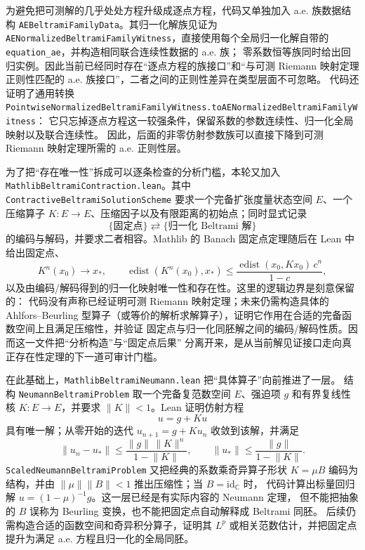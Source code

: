 \documentclass[UTF8,fontset=none,a4paper,11pt]{ctexart}
\begin{document}
为避免把可测解的几乎处处方程升级成逐点方程，代码又单独加入 a.e. 族数据结构
\texttt{AEBeltramiFamilyData}。其归一化解族见证为
\texttt{AENormalizedBeltramiFamilyWitness}，直接使用每个全局归一化解自带的
\texttt{equation\_ae}，并构造相同联合连续性数据的 a.e. 族；
零系数恒等族同时给出回归实例。因此当前已经同时存在“逐点方程的族接口”和“与可测 Riemann
映射定理正则性匹配的 a.e. 族接口”，二者之间的正则性差异在类型层面不可忽略。
代码还证明了通用转换
\texttt{PointwiseNormalizedBeltramiFamilyWitness.toAENormalizedBeltramiFamilyWitness}：
它只忘掉逐点方程这一较强条件，保留系数的参数连续性、归一化全局映射以及联合连续性。
因此，后面的非零仿射参数族可以直接下降到可测 Riemann 映射定理所需的 a.e. 正则性层。

为了把“存在唯一性”拆成可以逐条检查的分析门槛，本轮又加入
\texttt{MathlibBeltrami}\allowbreak\texttt{Contraction}\allowbreak\texttt{.lean}。其中
\texttt{ContractiveBeltrami}\allowbreak\texttt{SolutionScheme} 要求一个完备扩张度量状态空间
\(E\)、一个压缩算子 \(K:E\to E\)、压缩因子以及有限距离的初始点；同时显式记录
\[
\{\text{固定点}\}\rightleftarrows
\{\text{归一化 Beltrami 解}\}
\]
的编码与解码，并要求二者相容。Mathlib 的 Banach 固定点定理随后在 Lean 中给出固定点、
\[
K^n(x_0)\longrightarrow x_\ast,
\qquad
\operatorname{edist}(K^n(x_0),x_\ast)
\leq
\frac{\operatorname{edist}(x_0,Kx_0)\,c^n}{1-c},
\]
以及由编码/解码得到的归一化映射唯一性和存在性。这里的逻辑边界是刻意保留的：
代码没有声称已经证明可测 Riemann 映射定理；未来仍需构造具体的 Ahlfors--Beurling
型算子（或等价的解析求解算子），证明它作用在合适的完备函数空间上且满足压缩性，并验证
固定点与归一化同胚解之间的编码/解码性质。因而这一文件把“分析构造”与“固定点后果”
分离开来，是从当前解见证接口走向真正存在性定理的下一道可审计门槛。

在此基础上，\texttt{MathlibBeltramiNeumann}\allowbreak\texttt{.lean} 把“具体算子”向前推进了一层。
结构 \texttt{NeumannBeltramiProblem} 取一个完备复范数空间 \(E\)、强迫项 \(g\) 和有界复线性核
\(K:E\to E\)，并要求 \(\lVert K\rVert<1\)。Lean 证明仿射方程
\[
u=g+Ku
\]
具有唯一解；从零开始的迭代 \(u_{n+1}=g+Ku_n\) 收敛到该解，并满足
\[
\lVert u_n-u_\ast\rVert
\leq
\frac{\lVert g\rVert\,\lVert K\rVert^n}{1-\lVert K\rVert},
\qquad
\lVert u_\ast\rVert\leq
\frac{\lVert g\rVert}{1-\lVert K\rVert}.
\]
\texttt{ScaledNeumannBeltramiProblem} 又把经典的系数乘奇异算子形状
\(K=\mu B\) 编码为结构，并由
\(\lVert\mu\rVert\lVert B\rVert<1\) 推出压缩性；当 \(B=\mathrm{id}_{\mathbb C}\) 时，
代码计算出标量回归解 \(u=(1-\mu)^{-1}g\)。这一层已经是有实际内容的 Neumann 定理，
但不能把抽象的 \(B\) 误称为 Beurling 变换，也不能把固定点自动解释成 Beltrami 同胚。
后续仍需构造合适的函数空间和奇异积分算子，证明其 \(L^p\) 或相关范数估计，并把固定点
提升为满足 a.e. 方程且归一化的全局同胚。
\end{document}
